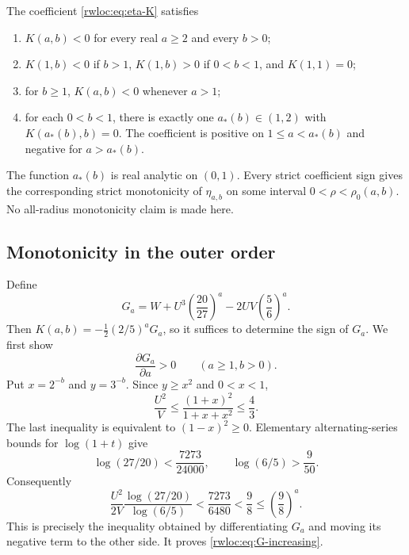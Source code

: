 \begin{theorem}
\label{rwloc:thm:radius-local-sign}
The coefficient \eqref{rwloc:eq:eta-K} satisfies
\begin{enumerate}
\item $K(a,b)<0$ for every real $a\ge2$ and every $b>0$;
\item $K(1,b)<0$ if $b>1$, $K(1,b)>0$ if $0<b<1$, and
      $K(1,1)=0$;
\item for $b\ge1$, $K(a,b)<0$ whenever $a>1$;
\item for each $0<b<1$, there is exactly one $a_*(b)\in(1,2)$
      with $K(a_*(b),b)=0$. The coefficient is positive on
      $1\le a<a_*(b)$ and negative for $a>a_*(b)$.
\end{enumerate}
The function $a_*(b)$ is real analytic on $(0,1)$. Every strict
coefficient sign gives the corresponding strict monotonicity of
$\eta_{a,b}$ on some interval $0<\rho<\rho_0(a,b)$. No all-radius
monotonicity claim is made here.
\end{theorem}

\subsection{Monotonicity in the outer order}
Define
\[
 G_a=W+U^3\left(\frac{20}{27}\right)^a
            -2UV\left(\frac56\right)^a.
\]
Then $K(a,b)=-\tfrac12(2/5)^aG_a$, so it suffices to determine
the sign of $G_a$. We first show
\begin{equation}\label{rwloc:eq:G-increasing}
 \frac{\partial G_a}{\partial a}>0\qquad(a\ge1, b>0).
\end{equation}
Put $x=2^{-b}$ and $y=3^{-b}$. Since $y\ge x^2$ and $0<x<1$,
\[
 \frac{U^2}{V}\le\frac{(1+x)^2}{1+x+x^2}\le\frac43.
\]
The last inequality is equivalent to $(1-x)^2\ge0$.
Elementary alternating-series bounds for $\log(1+t)$ give
\[
 \log(27/20)<\frac{7273}{24000},\qquad
 \log(6/5)>\frac9{50}.
\]
Consequently
\[
 \frac{U^2}{2V}
       \frac{\log(27/20)}{\log(6/5)}
 <\frac{7273}{6480}<\frac98
 \le\left(\frac98\right)^a.
\]
This is precisely the inequality obtained by differentiating $G_a$
and moving its negative term to the other side. It proves
\eqref{rwloc:eq:G-increasing}.

